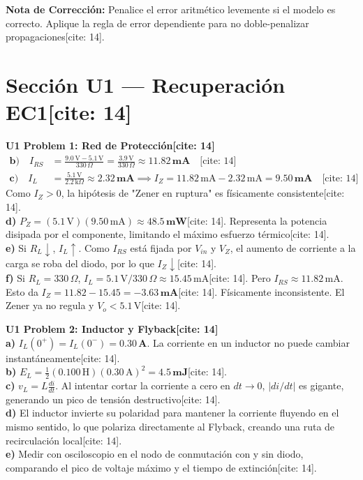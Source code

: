 \documentclass[11pt, a4paper]{article}
\begin{document}
\begin{tcolorbox}[colback=red!5, colframe=red!70!black, title=\textbf{Material Reservado Docente: Solucionario de Evaluación Diferida U1+U2[cite: 14]}]
    \textbf{Nota de Corrección:} Penalice el error aritmético levemente si el modelo es correcto. Aplique la regla de error dependiente para no doble-penalizar propagaciones[cite: 14].
\end{tcolorbox}

\section*{Sección U1 — Recuperación EC1[cite: 14]}
\textbf{U1 Problem 1: Red de Protección[cite: 14]}
\begin{align*}
    \textbf{b)} \quad I_{RS} &= \frac{9.0\,\text{V} - 5.1\,\text{V}}{330\,\Omega} = \frac{3.9\,\text{V}}{330\,\Omega} \approx \mathbf{11.82\,\text{mA}} \quad \text{[cite: 14]} \\
    \textbf{c)} \quad I_L &= \frac{5.1\,\text{V}}{2.2\,\text{k}\Omega} \approx \mathbf{2.32\,\text{mA}} \implies I_Z = 11.82\,\text{mA} - 2.32\,\text{mA} = \mathbf{9.50\,\text{mA}} \quad \text{[cite: 14]}
\end{align*}
Como $I_Z > 0$, la hipótesis de "Zener en ruptura" es físicamente consistente[cite: 14]. \\
\textbf{d)} $P_Z = (5.1\,\text{V})(9.50\,\text{mA}) \approx \mathbf{48.5\,\text{mW}}$[cite: 14]. Representa la potencia disipada por el componente, limitando el máximo esfuerzo térmico[cite: 14]. \\
\textbf{e)} Si $R_L \downarrow$, $I_L \uparrow$. Como $I_{RS}$ está fijada por $V_{in}$ y $V_Z$, el aumento de corriente a la carga se roba del diodo, por lo que $I_Z \downarrow$[cite: 14]. \\
\textbf{f)} Si $R_L = 330\,\Omega$, $I_L = 5.1\,\text{V} / 330\,\Omega \approx 15.45\,\text{mA}$[cite: 14]. Pero $I_{RS} \approx 11.82\,\text{mA}$. Esto da $I_Z = 11.82 - 15.45 = \mathbf{-3.63\,\text{mA}}$[cite: 14]. Físicamente inconsistente. El Zener ya no regula y $V_o < 5.1\,\text{V}$[cite: 14].

\vspace{0.2cm}
\textbf{U1 Problem 2: Inductor y Flyback[cite: 14]} \\
\textbf{a)} $I_L(0^+) = I_L(0^-) = \mathbf{0.30\,\text{A}}$. La corriente en un inductor no puede cambiar instantáneamente[cite: 14]. \\
\textbf{b)} $E_L = \frac{1}{2} (0.100\,\text{H}) (0.30\,\text{A})^2 = \mathbf{4.5\,\text{mJ}}$[cite: 14]. \\
\textbf{c)} $v_L = L \frac{di}{dt}$. Al intentar cortar la corriente a cero en $dt \to 0$, $|di/dt|$ es gigante, generando un pico de tensión destructivo[cite: 14]. \\
\textbf{d)} El inductor invierte su polaridad para mantener la corriente fluyendo en el mismo sentido, lo que polariza directamente al Flyback, creando una ruta de recirculación local[cite: 14]. \\
\textbf{e)} Medir con osciloscopio en el nodo de conmutación con y sin diodo, comparando el pico de voltaje máximo y el tiempo de extinción[cite: 14].
\end{document}
